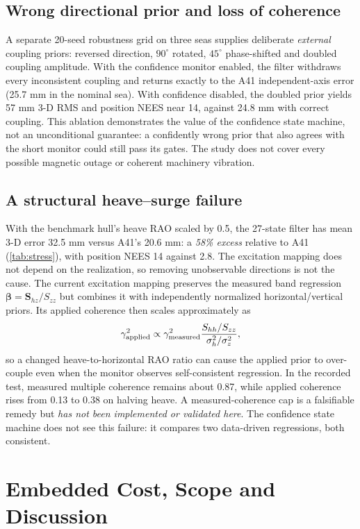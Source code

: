 \documentclass[conference]{IEEEtran}
\newcommand{\vct}[1]{\bm{#1}}
\newcommand{\InputPart}[1]{}
\begin{document}
\subsection{Wrong directional prior and loss of coherence}
A separate 20-seed robustness grid on three seas supplies deliberate
\emph{external} coupling priors: reversed direction, $90^\circ$ rotated,
$45^\circ$ phase-shifted and doubled coupling amplitude. With the
confidence monitor enabled, the filter withdraws every inconsistent
coupling and returns exactly to the A41 independent-axis error (25.7 mm in
the nominal sea). With confidence disabled, the doubled prior yields 57 mm
3-D RMS and position NEES near 14, against 24.8 mm with correct coupling.
This ablation demonstrates the value of the confidence state machine, not
an unconditional guarantee: a confidently wrong prior that also agrees
with the short monitor could still pass its gates. The study does not
cover every possible magnetic outage or coherent machinery vibration.

\subsection{A structural heave--surge failure}
With the benchmark hull's heave RAO scaled by 0.5, the 27-state filter has
mean 3-D error 32.5 mm versus A41's 20.6 mm: a \emph{58\% excess} relative
to A41 (\cref{tab:stress}), with position NEES 14 against 2.8. The
excitation mapping does not depend on the realization, so removing
unobservable directions is not the cause. The current
excitation mapping preserves the measured band regression
$\vct\beta=\vct S_{hz}/S_{zz}$ but combines it with independently
normalized horizontal/vertical priors. Its applied coherence then scales
approximately as
\begin{equation}
 \gamma_{\rm applied}^2\propto
 \gamma_{\rm measured}^2
 \frac{S_{hh}/S_{zz}}{\sigma_h^2/\sigma_z^2},
 \label{eq:overcouple}
\end{equation}
so a changed heave-to-horizontal RAO ratio can cause the applied prior to
over-couple even when the monitor observes self-consistent regression.
In the recorded test, measured multiple coherence remains about 0.87,
while applied coherence rises from 0.13 to 0.38 on halving heave. A
measured-coherence cap is a falsifiable remedy but \emph{has not been
implemented or validated here}. The confidence state machine does not see
this failure: it compares two data-driven regressions, both consistent.

\section{Embedded Cost, Scope and Discussion}
\label{sec:embedded}
\begin{table}[!t]
\caption{Structured analytic arithmetic for the model prediction and
accelerometer update, and for a \SI{0.1}{s} model commit. The final column
amortizes commits over the \SI{200}{Hz} sample rate.}
\label{tab:cost}
\centering\footnotesize
\resizebox{\columnwidth}{!}{\InputPart{csm-cost.tex-part}}
\end{table}
\end{document}
